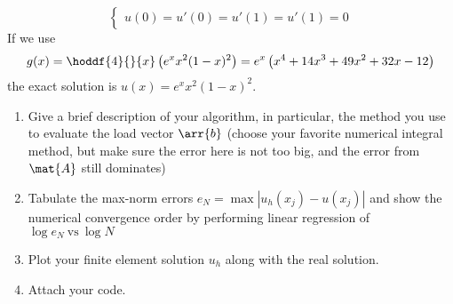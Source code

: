 \documentclass{article}
\begin{document}
\begin{enumerate}
\begin{enumerate}
\begin{equation*}
\begin{cases}
						u(0) = u'(0) = u'(1) = u'(1) = 0
					\end{cases}
				\end{equation*}
				If we use
				\begin{equation*}
					g(x) = \hoddf{4}{}{x}\left(e^x x^2(1 - x)^2\right) =
						e^x\left(x^4 + 14x^3 + 49x^2 + 32x - 12\right)
				\end{equation*}
				the exact solution is $u(x) = e^x x^2(1 - x)^2$.
				\begin{enumerate}
					\item Give a brief description of your algorithm, in particular,
						the method you use to evaluate the load vector $\arr{b}$
						(choose your favorite numerical integral method,
						but make sure the error here is not too big,
						and the error from $\mat{A}$ still dominates)
					\item Tabulate the max-norm errors $e_N = \max\left|u_h(x_j) - u(x_j)\right|$
						and show the numerical convergence order by performing linear regression of
						$\log{e_N} \mathrm{\ vs\ } \log{N}$
					\item Plot your finite element solution $u_h$ along with the real solution.
					\item Attach your code.
				\end{enumerate}
		\end{enumerate}
\end{enumerate}
\end{document}
